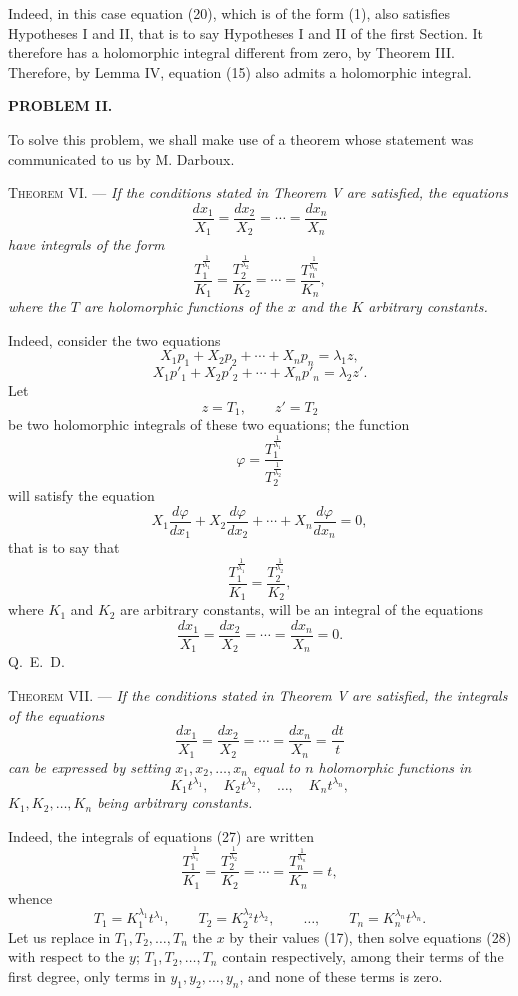 \documentclass[11pt]{article}
\begin{document}
Indeed, in this case equation (20), which is of the form (1), also satisfies Hypotheses I and II, that is to say Hypotheses I and II of the first Section. It therefore has a holomorphic integral different from zero, by Theorem III. Therefore, by Lemma IV, equation (15) also admits a holomorphic integral.

\begin{center}
{\bfseries PROBLEM II.}
\end{center}

To solve this problem, we shall make use of a theorem whose statement was communicated to us by M. Darboux.

\noindent\textsc{Theorem VI.} --- \emph{If the conditions stated in Theorem V are satisfied, the equations}
\[
\frac{dx_1}{X_1}=\frac{dx_2}{X_2}=\cdots=\frac{dx_n}{X_n}
\]
\emph{have integrals of the form}
\[
\frac{T_1^{\frac1{\lambda_1}}}{K_1}
=
\frac{T_2^{\frac1{\lambda_2}}}{K_2}
=\cdots=
\frac{T_n^{\frac1{\lambda_n}}}{K_n},
\]
\emph{where the $T$ are holomorphic functions of the $x$ and the $K$ arbitrary constants.}

Indeed, consider the two equations
\[
X_1p_1+X_2p_2+\cdots+X_np_n=\lambda_1z,
\]
\[
X_1p'_1+X_2p'_2+\cdots+X_np'_n=\lambda_2z'.
\]
Let
\[
z=T_1,\qquad z'=T_2
\]
be two holomorphic integrals of these two equations; the function
\[
\varphi=\frac{T_1^{\frac1{\lambda_1}}}{T_2^{\frac1{\lambda_2}}}
\]
will satisfy the equation
\[
X_1\frac{d\varphi}{dx_1}+X_2\frac{d\varphi}{dx_2}+\cdots+X_n\frac{d\varphi}{dx_n}=0,
\]
that is to say that
\[
\frac{T_1^{\frac1{\lambda_1}}}{K_1}
=
\frac{T_2^{\frac1{\lambda_2}}}{K_2},
\]
where $K_1$ and $K_2$ are arbitrary constants, will be an integral of the equations
\[
\frac{dx_1}{X_1}=\frac{dx_2}{X_2}=\cdots=\frac{dx_n}{X_n}=0.
\]
\hfill\mbox{Q. E. D.}

\noindent\textsc{Theorem VII.} --- \emph{If the conditions stated in Theorem V are satisfied, the integrals of the equations}
\begin{equation*}\tag{27}
\frac{dx_1}{X_1}=\frac{dx_2}{X_2}=\cdots=\frac{dx_n}{X_n}=\frac{dt}{t}
\end{equation*}
\emph{can be expressed by setting $x_1,x_2,\ldots,x_n$ equal to $n$ holomorphic functions in}
\[
K_1t^{\lambda_1},\quad K_2t^{\lambda_2},\quad \ldots,\quad K_nt^{\lambda_n},
\]
\emph{$K_1,K_2,\ldots,K_n$ being arbitrary constants.}

Indeed, the integrals of equations (27) are written
\[
\frac{T_1^{\frac1{\lambda_1}}}{K_1}
=
\frac{T_2^{\frac1{\lambda_2}}}{K_2}
=\cdots=
\frac{T_n^{\frac1{\lambda_n}}}{K_n}=t,
\]
whence
\begin{equation*}\tag{28}
T_1=K_1^{\lambda_1}t^{\lambda_1},
\qquad
T_2=K_2^{\lambda_2}t^{\lambda_2},
\qquad \ldots,
\qquad
T_n=K_n^{\lambda_n}t^{\lambda_n}.
\end{equation*}
Let us replace in $T_1,T_2,\ldots,T_n$ the $x$ by their values (17), then solve equations (28) with respect to the $y$; $T_1,T_2,\ldots,T_n$ contain respectively, among their terms of the first degree, only terms in $y_1,y_2,\ldots,y_n$, and none of these terms is zero.
\end{document}
